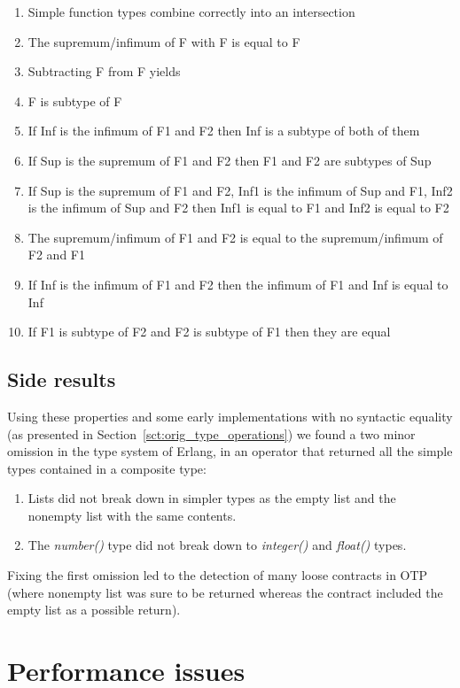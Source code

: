 \begin{enumerate}
\item Simple function types combine correctly into an intersection
\item The supremum/infimum of F with F is equal to F
\item Subtracting F from F yields \none
\item F is subtype of F
\item If Inf is the infimum of F1 and F2 then Inf is a subtype of both of
  them
\item If Sup is the supremum of F1 and F2 then F1 and F2 are subtypes of
  Sup
\item If Sup is the supremum of F1 and F2, Inf1 is the infimum of Sup
  and F1, Inf2 is the infimum of Sup and F2 then Inf1 is equal to F1
  and Inf2 is equal to F2
\item The supremum/infimum of F1 and F2 is equal to the
  supremum/infimum of F2 and F1
\item If Inf is the infimum of F1 and F2 then the infimum of F1 and
  Inf is equal to Inf
\item If F1 is subtype of F2 and F2 is subtype of F1 then they are equal
\end{enumerate}

\subsection{Side results}
\label{sct:side_results}

Using these properties and some early implementations with no
syntactic equality (as presented in
Section~\ref{sct:orig_type_operations}) we found a two minor omission
in the type system of Erlang, in an operator that returned all the
simple types contained in a composite type:
\begin{enumerate}
\item Lists did not break down in simpler types as the empty list and
  the nonempty list with the same contents.
\item The \emph{number()} type did not break down to \emph{integer()}
  and \emph{float()} types.
\end{enumerate}

Fixing the first omission led to the detection of many loose contracts
in OTP (where nonempty list was sure to be returned whereas the
contract included the empty list as a possible return).

\section{Performance issues}

